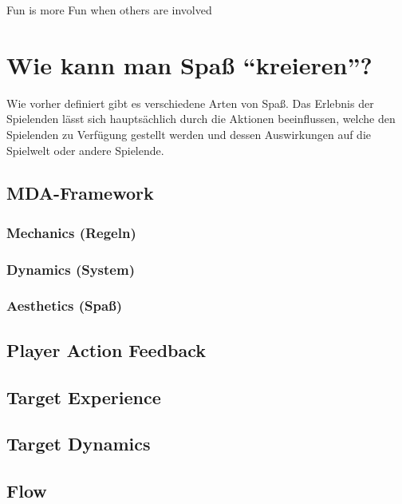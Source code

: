 Fun is more Fun when others are involved

\section{Wie kann man Spaß "`kreieren"'?}

Wie vorher definiert gibt es verschiedene Arten von Spaß. Das Erlebnis der Spielenden lässt sich hauptsächlich durch die Aktionen beeinflussen, welche den Spielenden zu Verfügung gestellt werden und dessen Auswirkungen auf die Spielwelt oder andere Spielende.

\subsection{MDA-Framework}

\subsubsection{Mechanics (Regeln)}

\subsubsection{Dynamics (System)}

\subsubsection{Aesthetics (Spaß)}

\subsection{Player Action Feedback}

\subsection{Target Experience}

\subsection{Target Dynamics}

\subsection{Flow}